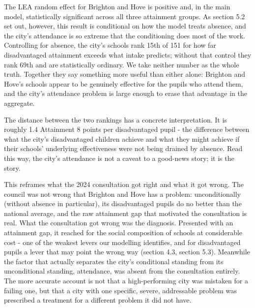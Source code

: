 \documentclass[
  12pt,
  titlepage]{article}
\begin{document}
The LEA random effect for Brighton and Hove is positive and, in the main
model, statistically significant across all three attainment groups. As
section 5.2 set out, however, this result is conditional on how the
model treats absence, and the city's attendance is so extreme that the
conditioning does most of the work. Controlling for absence, the city's
schools rank 15th of 151 for how far disadvantaged attainment exceeds
what intake predicts; without that control they rank 69th and are
statistically ordinary. We take neither number as the whole truth.
Together they say something more useful than either alone: Brighton and
Hove's schools appear to be genuinely effective for the pupils who
attend them, and the city's attendance problem is large enough to erase
that advantage in the aggregate.

The distance between the two rankings has a concrete interpretation. It
is roughly 1.4 Attainment 8 points per disadvantaged pupil - the
difference between what the city's disadvantaged children achieve and
what they might achieve if their schools' underlying effectiveness were
not being drained by absence. Read this way, the city's attendance is
not a caveat to a good-news story; it is the story.

This reframes what the 2024 consultation got right and what it got
wrong. The council was not wrong that Brighton and Hove has a problem:
unconditionally (without absence in particular), its disadvantaged
pupils do no better than the national average, and the raw attainment
gap that motivated the consultation is real. What the consultation got
wrong was the diagnosis. Presented with an attainment gap, it reached
for the social composition of schools at considerable cost - one of the
weakest levers our modelling identifies, and for disadvantaged pupils a
lever that may point the wrong way (section 4.3, section 5.3). Meanwhile
the factor that actually separates the city's conditional standing from
its unconditional standing, attendance, was absent from the consultation
entirely. The more accurate account is not that a high-performing city
was mistaken for a failing one, but that a city with one specific,
severe, addressable problem was prescribed a treatment for a different
problem it did not have.
\end{document}
